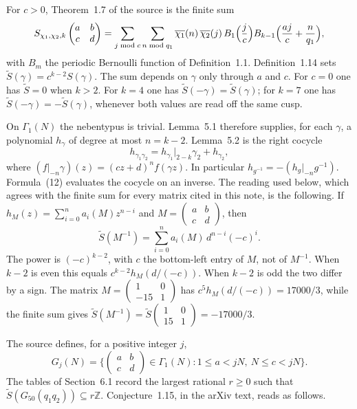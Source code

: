 \documentclass[11pt]{article}
\theoremstyle{remark}
\newcommand{\tS}{\widetilde{S}}
\newcommand{\Z}{\mathbb{Z}}
\begin{document}
For \(c>0\), Theorem~1.7 of the source is the finite sum
\[
S_{\chi_1,\chi_2,k}\begin{pmatrix}a&b\\c&d\end{pmatrix}
=\sum_{j\bmod c}\sum_{n\bmod q_1}
\overline{\chi_1}(n)\,\overline{\chi_2}(j)\,
B_1\Bigl(\frac{j}{c}\Bigr)
B_{k-1}\Bigl(\frac{aj}{c}+\frac{n}{q_1}\Bigr),
\]
with \(B_m\) the periodic Bernoulli function of Definition~1.1.
Definition~1.14 sets \(\tS(\gamma)=c^{k-2}S(\gamma)\).
The sum depends on \(\gamma\) only through \(a\) and \(c\).
For \(c=0\) one has \(\tS=0\) when \(k>2\).
For \(k=4\) one has \(\tS(-\gamma)=\tS(\gamma)\); for \(k=7\) one has \(\tS(-\gamma)=-\tS(\gamma)\), whenever both values are read off the same cusp.

On \(\Gamma_1(N)\) the nebentypus is trivial.
Lemma~5.1 therefore supplies, for each \(\gamma\), a polynomial \(h_\gamma\) of degree at most \(n=k-2\).
Lemma~5.2 is the right cocycle
\begin{equation}
\label{eq:cocycle}
h_{\gamma_1\gamma_2}=h_{\gamma_1}\big|_{2-k}\gamma_2+h_{\gamma_2},
\end{equation}
where \((f|_{-n}\gamma)(z)=(cz+d)^n f(\gamma z)\).
In particular \(h_{g^{-1}}=-(h_g|_{-n}g^{-1})\).
Formula~(12) evaluates the cocycle on an inverse.
The reading used below, which agrees with the finite sum for every matrix cited in this note, is the following.
If \(h_M(z)=\sum_{i=0}^{n}a_i(M)z^{n-i}\) and \(M=\begin{pmatrix}a&b\\c&d\end{pmatrix}\), then
\begin{equation}
\label{eq:eval}
\tS(M^{-1})=\sum_{i=0}^{n}a_i(M)\,d^{n-i}(-c)^{i}.
\end{equation}
The power is \((-c)^{k-2}\), with \(c\) the bottom-left entry of \(M\), not of \(M^{-1}\).
When \(k-2\) is even this equals \(c^{k-2}h_M(d/(-c))\).
When \(k-2\) is odd the two differ by a sign.
The matrix \(M=\begin{pmatrix}1&0\\-15&1\end{pmatrix}\) has \(c^5 h_M(d/(-c))=17000/3\), while the finite sum gives \(\tS(M^{-1})=\tS\begin{pmatrix}1&0\\15&1\end{pmatrix}=-17000/3\).

The source defines, for a positive integer \(j\),
\[
G_j(N)=\bigl\{\begin{pmatrix}a&b\\c&d\end{pmatrix}\in\Gamma_1(N):1\le a<jN,\ N\le c<jN\bigr\}.
\]
The tables of Section~6.1 record the largest rational \(r\ge 0\) such that \(\tS(G_{50}(q_1q_2))\subseteq r\Z\).
Conjecture~1.15, in the arXiv text, reads as follows.
\end{document}
